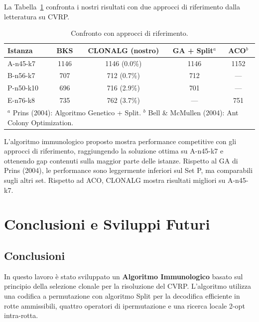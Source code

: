 \documentclass[a4paper,12pt]{article}
\begin{document}
La Tabella~\ref{tab:comparison} confronta i nostri risultati con due approcci di riferimento dalla letteratura su CVRP.

\begin{table}[H]
\centering
\caption{Confronto con approcci di riferimento.}
\label{tab:comparison}
\begin{tabular}{lcccc}
\toprule
Istanza & BKS & CLONALG (nostro) & GA + Split$^a$ & ACO$^b$ \\
\midrule
A-n45-k7 & 1146 & 1146 (0.0\%) & 1146 & 1152 \\
B-n56-k7 & 707 & 712 (0.7\%) & 712 & --- \\
P-n50-k10 & 696 & 716 (2.9\%) & 701 & --- \\
E-n76-k8 & 735 & 762 (3.7\%) & --- & 751 \\
\bottomrule
\multicolumn{5}{l}{\footnotesize $^a$ Prins (2004): Algoritmo Genetico + Split. $^b$ Bell \& McMullen (2004): Ant Colony Optimization.} \\
\end{tabular}
\end{table}

L'algoritmo immunologico proposto mostra performance competitive con gli approcci di riferimento, raggiungendo la soluzione ottima su A-n45-k7 e ottenendo gap contenuti sulla maggior parte delle istanze. Rispetto al GA di Prins (2004), le performance sono leggermente inferiori sul Set P, ma comparabili sugli altri set. Rispetto ad ACO, CLONALG mostra risultati migliori su A-n45-k7.


\section{Conclusioni e Sviluppi Futuri}

\subsection{Conclusioni}

In questo lavoro è stato sviluppato un \textbf{Algoritmo Immunologico} basato sul principio della selezione clonale per la risoluzione del CVRP. L'algoritmo utilizza una codifica a permutazione con algoritmo Split per la decodifica efficiente in rotte ammissibili, quattro operatori di ipermutazione e una ricerca locale 2-opt intra-rotta.
\end{document}
